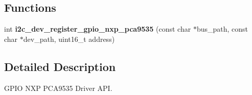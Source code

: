 \subsection*{Functions}
\begin{DoxyCompactItemize}
\item 
int {\bfseries i2c\+\_\+dev\+\_\+register\+\_\+gpio\+\_\+nxp\+\_\+pca9535} (const char $\ast$bus\+\_\+path, const char $\ast$dev\+\_\+path, uint16\+\_\+t address)
\end{DoxyCompactItemize}


\subsection{Detailed Description}
G\+P\+IO N\+XP P\+C\+A9535 Driver A\+PI. 


